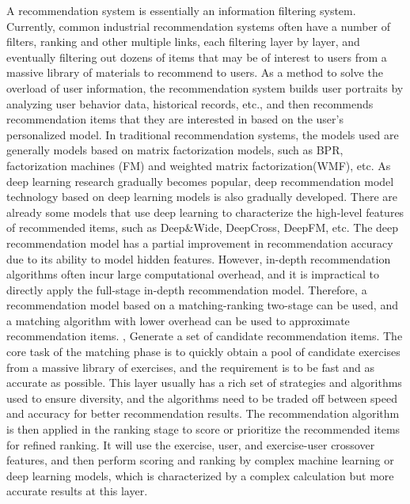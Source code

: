 A recommendation system is essentially an information filtering system. Currently, common industrial recommendation systems often have a number of filters, ranking and other multiple links, each filtering layer by layer, and eventually filtering out dozens of items that may be of interest to users from a massive library of materials to recommend to users. As a method to solve the overload of user information, the recommendation system builds user portraits by analyzing user behavior data, historical records, etc., and then recommends recommendation items that they are interested in based on the user's personalized model. In traditional recommendation systems, the models used are generally models based on matrix factorization models, such as BPR\cite{rendle2012bpr}, factorization machines (FM)\cite{koren2008factorization} and weighted matrix factorization(WMF)\cite{hu2008collaborative}, etc. As deep learning research gradually becomes popular, deep recommendation model technology based on deep learning models is also gradually developed. There are already some models that use deep learning to characterize the high-level features of recommended items, such as Deep\&Wide\cite{cheng2016wide}, DeepCross\cite{shan2016deep}, DeepFM\cite{guo2017deepfm}, etc. The deep recommendation model has a partial improvement in recommendation accuracy due to its ability to model hidden features. However, in-depth recommendation algorithms often incur large computational overhead, and it is impractical to directly apply the full-stage in-depth recommendation model. Therefore, a recommendation model based on a matching-ranking two-stage can be used, and a matching algorithm with lower overhead can be used to approximate recommendation items. , Generate a set of candidate recommendation items. The core task of the matching phase is to quickly obtain a pool of candidate exercises from a massive library of exercises, and the requirement is to be fast and as accurate as possible. This layer usually has a rich set of strategies and algorithms used to ensure diversity, and the algorithms need to be traded off between speed and accuracy for better recommendation results. The recommendation algorithm is then applied in the ranking stage to score or prioritize the recommended items for refined ranking. It will use the exercise, user, and exercise-user crossover features, and then perform scoring and ranking by complex machine learning or deep learning models, which is characterized by a complex calculation but more accurate results at this layer.

